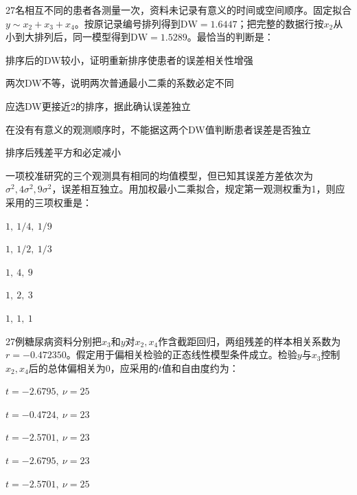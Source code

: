 \par\noindent\begin{minipage}{\linewidth}
27名相互不同的患者各测量一次，资料未记录有意义的时间或空间顺序。固定拟合$y\sim x_2+x_3+x_4$。按原记录编号排列得到$\mathrm{DW}=1.6447$；把完整的数据行按$x_2$从小到大排列后，同一模型得到$\mathrm{DW}=1.5289$。最恰当的判断是：
\begin{choices}
\item 排序后的DW较小，证明重新排序使患者的误差相关性增强
\item 两次DW不等，说明两次普通最小二乘的系数必定不同
\item 应选DW更接近2的排序，据此确认误差独立
\item 在没有有意义的观测顺序时，不能据这两个DW值判断患者误差是否独立
\item 排序后残差平方和必定减小
\end{choices}
\end{minipage}\par\medskip

\par\noindent\begin{minipage}{\linewidth}
一项校准研究的三个观测具有相同的均值模型，但已知其误差方差依次为$\sigma^2,4\sigma^2,9\sigma^2$，误差相互独立。用加权最小二乘拟合，规定第一观测权重为1，则应采用的三项权重是：
\begin{choices}
\item $1,\ 1/4,\ 1/9$
\item $1,\ 1/2,\ 1/3$
\item $1,\ 4,\ 9$
\item $1,\ 2,\ 3$
\item $1,\ 1,\ 1$
\end{choices}
\end{minipage}\par\medskip

\par\noindent\begin{minipage}{\linewidth}
27例糖尿病资料分别把$x_3$和$y$对$x_2,x_4$作含截距回归，两组残差的样本相关系数为$r=-0.472350$。假定用于偏相关检验的正态线性模型条件成立。检验$y$与$x_3$控制$x_2,x_4$后的总体偏相关为0，应采用的$t$值和自由度约为：
\begin{choices}
\item $t=-2.6795,\ \nu=25$
\item $t=-0.4724,\ \nu=23$
\item $t=-2.5701,\ \nu=23$
\item $t=-2.6795,\ \nu=23$
\item $t=-2.5701,\ \nu=25$
\end{choices}
\end{minipage}\par\medskip

